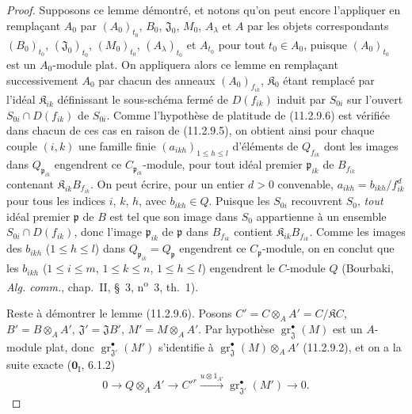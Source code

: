 \begin{proof}
Supposons ce lemme démontré, et notons qu'on peut encore l'appliquer en
remplaçant $A_0$ par $(A_0)_{t_0}$, $B_0$, $\mathfrak J_0$, $M_0$,
$A_\lambda$ et $A$ par les objets correspondants $(B_0)_{t_0}$,
$(\mathfrak J_0)_{t_0}$, $(M_0)_{t_0}$, $(A_\lambda)_{t_0}$ et $A_{t_0}$ pour
tout $t_0\in A_0$, puisque $(A_0)_{t_0}$ est un $A_0$-module plat. On
appliquera alors ce lemme en remplaçant successivement $A_0$ par chacun des
anneaux $(A_0)_{f_{ik}}$, $\mathfrak K_0$ étant remplacé par l'idéal
$\mathfrak K_{ik}$ définissant le sous-schéma fermé de $D(f_{ik})$ induit par
$S_{0i}$ sur l'ouvert $S_{0i}\cap D(f_{ik})$ de $S_{0i}$. Comme l'hypothèse
de platitude de (11.2.9.6) est vérifiée dans chacun de ces cas en raison de
(11.2.9.5), on obtient ainsi pour chaque couple $(i,k)$ une famille finie
$(a_{ikh})_{1\leq h\leq l}$ d'éléments de $Q_{f_{ik}}$ dont les images dans
$Q_{\mathfrak p_{ik}}$ engendrent ce $C_{\mathfrak p_{ik}}$-module, pour tout
idéal premier $\mathfrak p_{ik}$ de $B_{f_{ik}}$ contenant
$\mathfrak K_{ik}B_{f_{ik}}$. On peut écrire, pour un entier $d>0$ convenable,
$a_{ikh}=b_{ikh}/f_{ik}^d$ pour tous les indices $i$, $k$, $h$, avec
$b_{ikh}\in Q$. Puisque les $S_{0i}$ recouvrent $S_0$, \emph{tout} idéal premier
$\mathfrak p$ de $B$ est tel que son image dans $S_0$ appartienne à un
ensemble $S_{0i}\cap D(f_{ik})$, donc l'image $\mathfrak p_{ik}$ de
$\mathfrak p$ dans $B_{f_{ik}}$ contient $\mathfrak K_{ik}B_{f_{ik}}$. Comme
les images des $b_{ikh}$ ($1\leq h\leq l$) dans
$Q_{\mathfrak p_{ik}}=Q_\mathfrak p$ engendrent ce $C_\mathfrak p$-module,
on en conclut que les $b_{ikh}$
($1\leq i\leq m$, $1\leq k\leq n$, $1\leq h\leq l$) engendrent le
$C$-module $Q$ (Bourbaki, \emph{Alg. comm.}, chap.~II, \S~3, n\textsuperscript{o}~3,
th.~1).

Reste à démontrer le lemme (11.2.9.6). Posons
$C'=C\otimes_AA'=C/\mathfrak KC$, $B'=B\otimes_AA'$, $\mathfrak J'=\mathfrak JB'$,
$M'=M\otimes_AA'$.
Par hypothèse $\operatorname{gr}_{\mathfrak J}^\bullet(M)$ est un $A$-module plat,
donc $\operatorname{gr}_{\mathfrak J'}^\bullet(M')$ s'identifie à
$\operatorname{gr}_{\mathfrak J}^\bullet(M)\otimes_AA'$ (11.2.9.2), et on a la
suite exacte ($\mathbf 0_{\mathrm I}$, 6.1.2)
\begin{equation}
0\longrightarrow Q\otimes_AA'\longrightarrow C'^{r}
\xrightarrow{u\otimes1_{A'}}\operatorname{gr}_{\mathfrak J'}^\bullet(M')
\longrightarrow0.
\label{IV.11.2.9.7-fr}
\tag{11.2.9.7}
\end{equation}


\end{proof}
